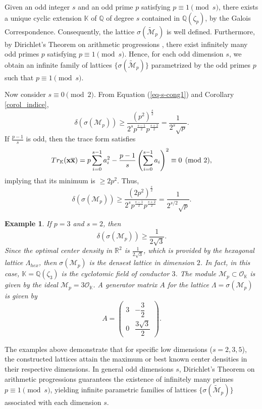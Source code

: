 \documentclass{amsart}
\newtheorem{remark}[theorem]{Remark}
\newtheorem{example}[theorem]{Example}
\begin{document}

Given an odd integer $s$ and an odd prime $p$ satisfying $p\equiv 1 \pmod{s}$, there exists a unique cyclic extension $\mathbb{K}$ of $\mathbb{Q}$ of degree $s$ contained in $\mathbb{Q}(\zeta_p)$, by the Galois Correspondence. Consequently, the lattice $\sigma(\tilde{\mathcal{M}}_p)$ is well defined. Furthermore, by Dirichlet's Theorem on arithmetic progressions \cite[p.~253]{ribenboim}, there exist infinitely many odd primes $p$ satisfying $p\equiv 1 \pmod{s}$. Hence, for each odd dimension $s$, we obtain an infinite family of lattices $\{\sigma(\tilde{\mathcal{M}}_p)\}$ parametrized by the odd primes $p$ such that $p\equiv 1 \pmod{s}$.

Now consider $s\equiv 0\pmod{2}$. From Equation (\ref{eq-s-cong1}) and Corollary \ref{corol_indice}, \[ \delta(\sigma(\mathcal{M}_p)) \geq \frac{(p^2)^{\frac{s}{2}}}{2^sp^{\frac{s-1}{2}}p^{\frac{s+2}{2}}} = \frac{1}{2^s\sqrt{p}}. \] 
If $\frac{p-1}{s}$ is odd, then the trace form satisfies \[ Tr_{\mathbb{K}}({\bf x} \overline{\bf x}) = p\sum_{i=0}^{s-1}a_i^2-\frac{p-1}{s}\left(\sum_{i=0}^{s-1}a_i\right)^2 \equiv 0 \pmod{2}, \]
implying that its minimum is $\geq 2p^2$. Thus, \[ \delta(\sigma(\mathcal{M}_p)) \geq \frac{(2p^2)^{\frac{s}{2}}}{2^sp^{\frac{s-1}{2}}p^{\frac{s+2}{2}}} = \frac{1}{2^{s/2}\sqrt{p}}. \]

\begin{example}
    If $p=3$ and $s=2$, then \[ \delta(\sigma(\mathcal{M}_p)) \geq \frac{1}{2\sqrt{3}}.\] Since the optimal center density in $\mathbb{R}^2$ is $\frac{1}{2\sqrt{3}}$, which is provided by the hexagonal lattice $\Lambda_{hex}$, then $\sigma(\mathcal{M}_p)$ is the densest lattice in dimension $2$. In fact, in this case, $\mathbb{K} = \mathbb{Q}(\zeta_3)$ is the cyclotomic field of conductor $3$. The module $\mathcal{M}_p \subset \mathcal{O}_\mathbb{K}$ is given by the ideal $\mathcal{M}_p = 3\mathcal{O}_\mathbb{K}$. A generator matrix $A$ for the lattice $\Lambda = \sigma(\mathcal{M}_p)$ is given by
\[
A = \begin{pmatrix}
3 & -\dfrac{3}{2} \\[6pt]
0 & \dfrac{3\sqrt{3}}{2}
\end{pmatrix}.
\]
\end{example}

The examples above demonstrate that for specific low dimensions ($s = 2, 3, 5$), the constructed lattices attain the maximum or best known center densities in their respective dimensions. In general odd dimensions $s$, Dirichlet's Theorem on arithmetic progressions guarantees the existence of infinitely many primes $p \equiv 1 \pmod s$, yielding infinite parametric families of lattices $\{\sigma(\tilde{\mathcal{M}}_p)\}$ associated with each dimension $s$.
\end{document}
